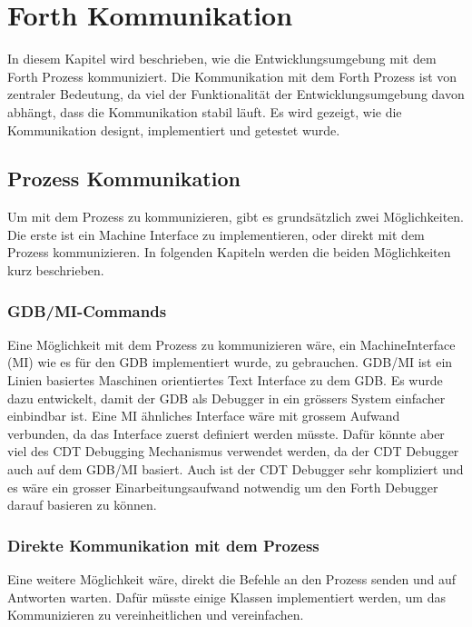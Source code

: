 \chapter{Forth Kommunikation}
\label{chap:forthcommunication}

In diesem Kapitel wird beschrieben, wie die Entwicklungsumgebung mit dem Forth Prozess kommuniziert. Die Kommunikation mit dem Forth Prozess ist von zentraler Bedeutung, da viel der Funktionalität der Entwicklungsumgebung davon abhängt, dass die Kommunikation stabil läuft. Es wird gezeigt, wie die Kommunikation designt, implementiert und getestet wurde.

\section{Prozess Kommunikation}
Um mit dem Prozess zu kommunizieren, gibt es grundsätzlich zwei Möglichkeiten. Die erste ist ein Machine Interface zu implementieren, oder direkt mit dem Prozess kommunizieren. In folgenden Kapiteln werden die beiden Möglichkeiten kurz beschrieben.

\subsection{GDB/MI-Commands}

Eine Möglichkeit mit dem Prozess zu kommunizieren wäre, ein MachineInterface (MI) wie es für den GDB implementiert wurde, zu gebrauchen. GDB/MI ist ein Linien basiertes Maschinen orientiertes Text Interface zu dem GDB. Es wurde dazu entwickelt, damit der GDB als Debugger in ein grössers System einfacher einbindbar ist.\cite{gdb} Eine MI ähnliches Interface wäre mit grossem Aufwand verbunden, da das Interface zuerst definiert werden müsste. Dafür könnte aber viel des CDT Debugging Mechanismus verwendet werden, da der CDT Debugger auch auf dem GDB/MI basiert. Auch ist der CDT Debugger sehr kompliziert\cite{mieclipse} und es wäre ein grosser Einarbeitungsaufwand notwendig um den Forth Debugger darauf basieren zu können.\cite{mieclipse}

\subsection{Direkte Kommunikation mit dem Prozess}

Eine weitere Möglichkeit wäre, direkt die Befehle an den Prozess senden und auf Antworten warten. Dafür müsste einige Klassen implementiert werden, um das Kommunizieren zu vereinheitlichen und vereinfachen.


